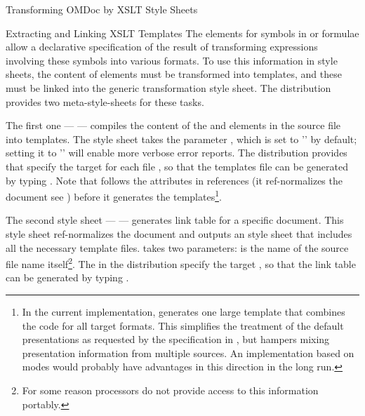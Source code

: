 \begin{tchapter}[id=transform-xsl,short=Transforming OMDoc]{Transforming OMDoc by XSLT Style Sheets}
\begin{tsection}[id=extract-link-xslt]{Extracting and Linking XSLT Templates}
The {} elements for symbols in {\openmath} or {\cmathml}
formulae allow a declarative specification of the result of transforming
expressions involving these symbols into various formats. To use this information
in {\xslt} style sheets, the content of {} elements must be
transformed into {\xslt} templates, and these must be linked into the generic
transformation style sheet. The {\omdoc} distribution provides two
meta-style-sheets for these tasks.

The first one --- {} --- compiles the content of the
{} and {} elements in the source file into {\xslt}
templates. The style sheet takes the parameter
{}, which is set to '{}' by default; setting it to
'{}' will enable more verbose error reports. The {\omdoc} distribution
provides {\unix} {} that specify the target
{} for each {\omdoc} file
{}, so that the templates file can be generated by typing
{}. Note that {} follows the
{} attributes in {\omdoc} references (it ref-normalizes the document
see {}) before it generates the templates\footnote{In the current
  implementation, {} generates one large template that combines the
  {\xslt} code for all target formats. This simplifies the treatment of the default
  presentations as requested by the specification in {}, but
  hampers mixing presentation information from multiple sources. An implementation based
  on modes would probably have advantages in this direction in the long run.}.

The second style sheet --- {} --- generates link table for a
specific {\omdoc} document. This style sheet ref-normalizes the document and outputs an
{\xslt} style sheet that includes all the necessary template
files. {} takes two parameters: {} is the name of the
source file name itself\footnote{For some reason {\xslt} processors do not provide access
  to this information portably.}. The {} in the {\omdoc} distribution
specify the target {}, so that the link table can be
generated by typing {}.


\end{tsection}
\end{tchapter}

